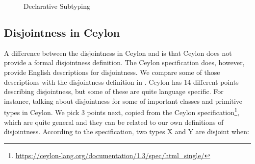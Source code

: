 \begin{figure}[t]
  \caption{Declarative Subtyping}
  \label{fig:discussion:ds}
\end{figure}

\subsection{Disjointness in Ceylon}
\label{sec:discussion:ceylon}
\begin{comment}
\ningning{A similar example is used in the overview. Maybe we want to be
  consistent with the examples.}
\baber{I will make this example consistent with the example in overview. But I suppose
  I should be using Ceylon syntax in this section.}

\begin{figure}[t]
\begin{lstlisting}[xleftmargin=.2\textwidth, xrightmargin=.2\textwidth]
// Student <: Person
// speak function will not type check
void speak(Person | Student val) {
  switch (val)
  case (is Person) {print("person speaks");}
  case (is Student) {print("student speaks");}
}
\end{lstlisting}
\caption{Ceylon disjointness code example.}
\label{discussion:list:ceylon}
\end{figure}

\noindent The function \emph{speak} in \Cref{discussion:list:ceylon}
will not type check in Ceylon. Because \emph{Person} and
\emph{Student} are not disjoint types. \emph{Person} and \emph{Student} both have a common
subtype which is \emph{Student}. \cal will also reject such programs.
\end{comment}
A difference between the disjointness in Ceylon and \cal is that
Ceylon does not provide
a formal disjointness definition.
The Ceylon specification does, however, provide English descriptions
for disjointness.
We compare some of those descriptions with
the disjointness definition in \cal. Ceylon has 14 different points describing
disjointness, but some of these are quite language specific. For instance, talking
about disjointness for some of important classes and primitive types in Ceylon.
We pick 3 points next, copied from the
Ceylon specification\footnote{\url{https://ceylon-lang.org/documentation/1.3/spec/html_single/}}, which are quite general and they can be related to our
own definitions of disjointness.
According to the specification, two types X and Y are disjoint when:

